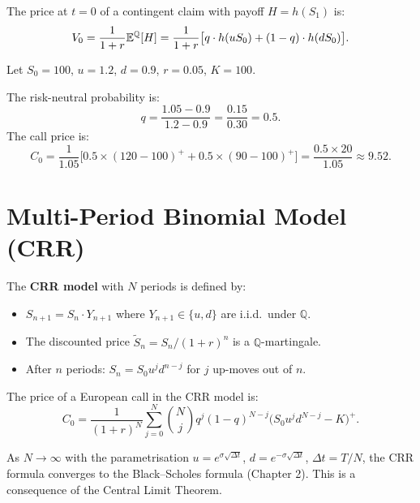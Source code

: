 \begin{keyformulas}[title=\textbf{Risk-Neutral Pricing of a Contingent Claim}]
The price at $t=0$ of a contingent claim with payoff $H = h(S_1)$ is:
\[
    V_0 = \frac{1}{1+r}\mathbb{E}^\mathbb{Q}[H]
        = \frac{1}{1+r}\bigl[q \cdot h(uS_0) + (1-q) \cdot h(dS_0)\bigr].
\]
\end{keyformulas}

\begin{example}
Let $S_0 = 100$, $u = 1.2$, $d = 0.9$, $r = 0.05$, $K = 100$.

The risk-neutral probability is:
\[
    q = \frac{1.05 - 0.9}{1.2 - 0.9} = \frac{0.15}{0.30} = 0.5.
\]
The call price is:
\[
    C_0 = \frac{1}{1.05}\bigl[0.5 \times (120-100)^+ + 0.5 \times (90-100)^+\bigr]
        = \frac{0.5 \times 20}{1.05} \approx 9.52.
\]
\end{example}

\section{Multi-Period Binomial Model (CRR)}

\begin{definition}
The \textbf{CRR model} with $N$ periods is defined by:
\begin{itemize}
    \item $S_{n+1} = S_n \cdot Y_{n+1}$ where $Y_{n+1} \in \{u, d\}$
          are i.i.d.\ under $\mathbb{Q}$.
    \item The discounted price $\tilde{S}_n = S_n / (1+r)^n$ is a
          $\mathbb{Q}$-martingale.
    \item After $n$ periods: $S_n = S_0 u^j d^{n-j}$ for $j$ up-moves
          out of $n$.
\end{itemize}
\end{definition}

\begin{theorem}
The price of a European call in the CRR model is:
\[
    C_0 = \frac{1}{(1+r)^N} \sum_{j=0}^{N} \binom{N}{j} q^j (1-q)^{N-j}
    \bigl(S_0 u^j d^{N-j} - K\bigr)^+.
\]
\end{theorem}

\begin{intuition}[title=\textbf{Convergence to Black--Scholes}]
As $N \to \infty$ with the parametrisation $u = e^{\sigma\sqrt{\Delta t}}$,
$d = e^{-\sigma\sqrt{\Delta t}}$, $\Delta t = T/N$, the CRR formula converges
to the Black--Scholes formula (Chapter 2). This is a consequence of the
Central Limit Theorem.
\end{intuition}


